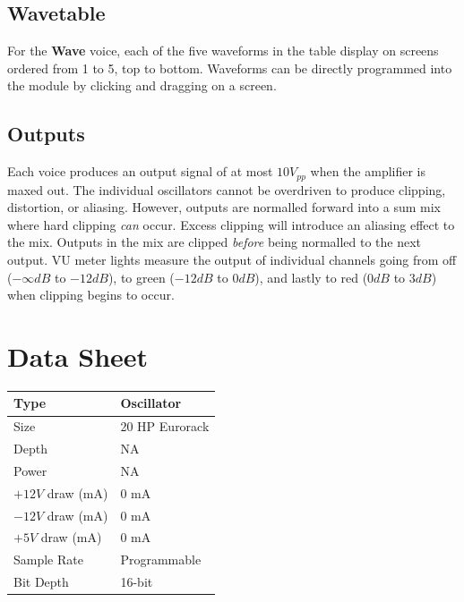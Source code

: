 \documentclass[12pt,letter]{article}
\begin{document}
\subsection{Wavetable}

For the \textbf{Wave} voice, each of the five waveforms in the table display on screens ordered from 1 to 5, top to bottom. Waveforms can be directly programmed into the module by clicking and dragging on a screen.

\subsection{Outputs}

Each voice produces an output signal of at most $10V_{pp}$ when the amplifier is maxed out. The individual oscillators cannot be overdriven to produce clipping, distortion, or aliasing. However, outputs are normalled forward into a sum mix where hard clipping \textit{can} occur. Excess clipping will introduce an aliasing effect to the mix. Outputs in the mix are clipped \textit{before} being normalled to the next output. VU meter lights measure the output of individual channels going from off ($-\infty dB$ to $-12dB$), to green ($-12dB$ to $0dB$), and lastly to red ($0dB$ to $3dB$) when clipping begins to occur.


\clearpage
\section{Data Sheet}

\begin{table}[!htp]
\begin{tabular}{|l|l|}
\hline
Type             & Oscillator               \\
\hline
Size             & 20 HP Eurorack           \\
\hline
Depth            & NA                       \\
\hline
Power            & NA                       \\ %
\hline
$+12V$ draw (mA) & 0 mA                     \\
\hline
$-12V$ draw (mA) & 0 mA                     \\
\hline
$+5V$ draw (mA)  & 0 mA                     \\
\hline
Sample Rate      & Programmable             \\
\hline
Bit Depth        & 16-bit                   \\
\hline
\end{tabular}
\end{table}


\clearpage
\renewcommand\refname{References}
\nocite{*}


\end{document}
